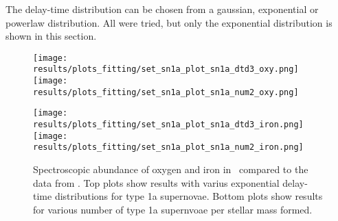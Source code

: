 The delay-time distribution can be chosen from a gaussian, exponential or powerlaw distribution.
All were tried, but only the exponential distribution is shown in this section.

\begin{figure}[h]
  \begin{minipage}[h][][t]{0.4\textwidth}
    \centering
    \texttt{[image: results/plots\_fitting/set\_sn1a\_plot\_sn1a\_dtd3\_oxy.png]}
    \texttt{[image: results/plots\_fitting/set\_sn1a\_plot\_sn1a\_num2\_oxy.png]}
  \end{minipage}
  \hfill
  \begin{minipage}[h][][t]{0.4\textwidth}
    \centering
    \texttt{[image: results/plots\_fitting/set\_sn1a\_plot\_sn1a\_dtd3\_iron.png]}
    \texttt{[image: results/plots\_fitting/set\_sn1a\_plot\_sn1a\_num2\_iron.png]}
  \end{minipage}
  \caption[Fit of type 1a supernovae \fiduccialomega]{\label{fig:fit-sn1a}
    Spectroscopic abundance of oxygen and iron in \omegamodel\ compared to the data from \eris.
    Top plots show results with varius exponential delay-time distributions for type 1a supernovae.
    Bottom plots show results for various number of type 1a supernvoae per stellar mass formed.
  }
\end{figure}

